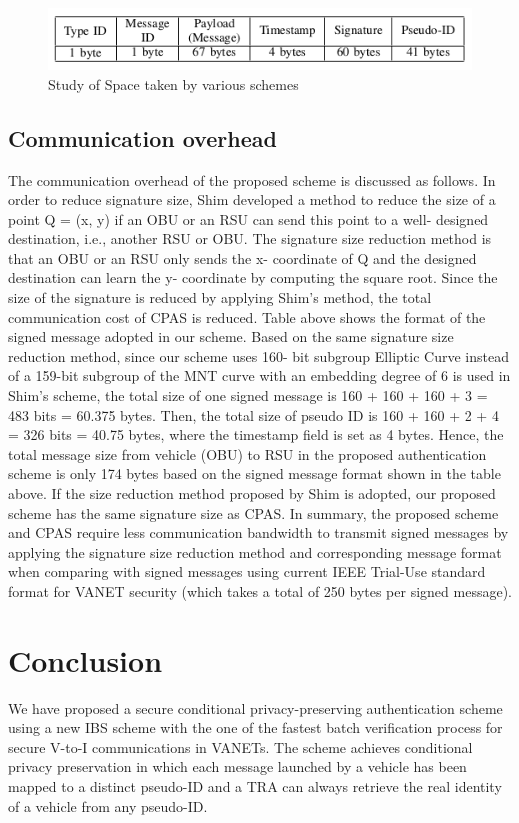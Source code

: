 \documentclass[10pt,journal,letterpaper]{IEEEtran}
\begin{document}
\begin{figure}[h]
    \centering
    \captionsetup{justification=centering}
    \includegraphics[scale=0.5]{space.png}
    \caption{Study of Space taken by various schemes}
    \label{fig:Space_Taken}
\end{figure}


\subsection{Communication overhead}
The communication overhead of the proposed scheme is discussed as
follows. In order to reduce signature size, Shim\cite{r1} developed
a method to reduce the size of a point Q = (x, y) if an OBU or an
RSU can send this point to a well- designed destination, i.e.,
another RSU or OBU. The signature size reduction method is that an
OBU or an RSU only sends the x- coordinate of Q and the designed
destination can learn the y- coordinate by computing the square
root. Since the size of the signature is reduced by applying
Shim’s method, the total communication cost of CPAS is reduced.
Table above shows the format of the signed message adopted in our
scheme. Based on the same signature size reduction method, since our
scheme uses 160- bit subgroup Elliptic Curve instead of a 159-bit
subgroup of the MNT curve with an embedding degree of 6 is used in
Shim’s scheme, the total size of one signed message is 160 + 160 +
160 + 3 = 483 bits = 60.375 bytes. Then, the total size of pseudo ID
is 160 + 160 + 2 + 4 = 326 bits = 40.75 bytes, where the timestamp
field is set as 4 bytes. Hence, the total message size from vehicle
(OBU) to RSU in the proposed authentication scheme is only 174 bytes
based on the signed message format shown in the table above. If the
size reduction method proposed by Shim\cite{r1} is adopted, our
proposed scheme has the same signature size as CPAS. In summary, the
proposed scheme and CPAS require less communication bandwidth to
transmit signed messages by applying the signature size reduction
method and corresponding message format when comparing with signed
messages using current IEEE Trial-Use standard format for VANET
security (which takes a total of 250 bytes per signed message).


\section{Conclusion}
\label{L8}We have proposed a secure conditional privacy-preserving
authentication scheme using a new IBS scheme with the one of the
fastest batch verification process for secure V-to-I communications
in VANETs. The scheme achieves conditional privacy preservation in
which each message launched by a vehicle has been mapped to a
distinct pseudo-ID and a TRA can always retrieve the real identity
of a vehicle from any pseudo-ID.
\end{document}
